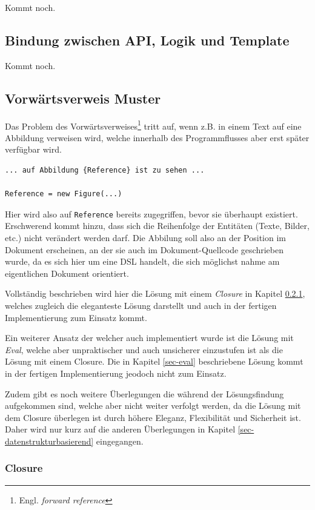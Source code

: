 Kommt noch.

\subsection{Bindung zwischen API, Logik und Template}

Kommt noch.

\subsection{Vorwärtsverweis Muster}\label{sec-forwardreference}

Das Problem des
Vorwärtsverweises\footnote{Engl. \emph{forward reference}} tritt auf,
wenn z.B. in einem Text auf eine Abbildung
verweisen wird, welche innerhalb des Programmflusses aber erst später verfügbar
wird.

\begin{lstlisting}
... auf Abbildung {Reference} ist zu sehen ...

Reference = new Figure(...)
\end{lstlisting}

Hier wird also auf \lstinline|Reference| bereits zugegriffen,
bevor sie überhaupt existiert. Erschwerend kommt hinzu, dass sich die
Reihenfolge der Entitäten (Texte, Bilder, etc.) nicht verändert werden darf.
Die Abbilung soll also an der Position im Dokument erscheinen, an der sie
auch im Dokument-Quellcode geschrieben wurde, da es sich hier um eine DSL
handelt, die sich möglichst nahme am eigentlichen Dokument orientiert.

Vollständig beschrieben wird hier die Lösung mit einem \emph{Closure} in
Kapitel \ref{sec-closure}, welches zugleich die eleganteste Lösung darstellt
und auch in der fertigen Implementierung zum Einsatz kommt.

Ein weiterer Ansatz der welcher auch implementiert wurde ist die Lösung
mit \emph{Eval}, welche aber unpraktischer und auch unsicherer einzustufen
ist als die Lösung mit einem Closure. Die in Kapitel \ref{sec-eval}
beschriebene Lösung kommt in der fertigen Implementierung jeodoch nicht
zum Einsatz.

Zudem gibt es noch weitere Überlegungen die während der Lösungsfindung
aufgekommen sind, welche aber nicht weiter verfolgt werden, da die Lösung
mit dem Closure überlegen ist durch höhere Eleganz, Flexibilität und
Sicherheit ist. Daher wird nur kurz auf die anderen Überlegungen in
Kapitel \ref{sec-datenstrukturbasierend} eingegangen.

\subsubsection{Closure}\label{sec-closure}

